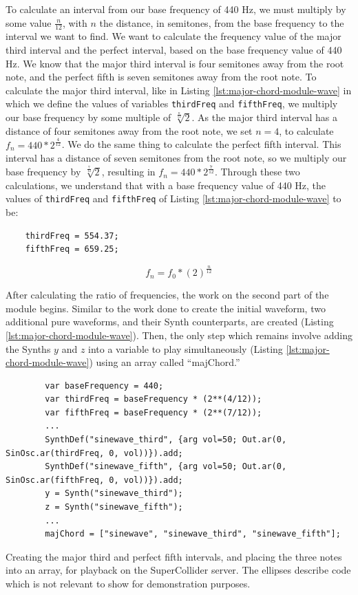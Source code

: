 To calculate an interval from our base frequency of 440 Hz, we must multiply by some value $\frac{n}{12}$, with $n$ the distance, in semitones, from the base frequency to the interval we want to find. We want to calculate the frequency value of the major third interval and the perfect interval, based on the base frequency value of 440 Hz. We know that the major third interval is four semitones away from the root note, and the perfect fifth is seven semitones away from the root note. To calculate the major third interval, like in Listing \ref{lst:major-chord-module-wave} in which we define the values of variables \texttt{thirdFreq} and \texttt{fifthFreq}, we multiply our base frequency by some multiple of $\sqrt[\frac{n}{12}]{2}$. As the major third interval has a distance of four semitones away from the root note, we set $n = 4$, to calculate $f_n = 440 * 2^{\frac{4}{12}}$. We do the same thing to calculate the perfect fifth interval. This interval has a distance of seven semitones from the root note, so we multiply our base frequency by $\sqrt[\frac{7}{12}]{2}$, resulting in $f_n = 440 * 2^{\frac{7}{12}}$. Through these two calculations, we understand that with a base frequency value of 440 Hz, the values of \texttt{thirdFreq} and \texttt{fifthFreq} of Listing \ref{lst:major-chord-module-wave} to be: 

\begin{verbatim}
    thirdFreq = 554.37;
    fifthFreq = 659.25;
\end{verbatim}

\begin{equation}
	f_n = f_0 * (2)^{\frac{n}{12}}
	\label{eq:equal-temperament-eq}
\end{equation}

After calculating the ratio of frequencies, the work on the second part of the module begins. Similar to the work done to create the initial waveform, two additional pure waveforms, and their Synth counterparts, are created (Listing \ref{lst:major-chord-module-wave}). Then, the only step which remains involve adding the Synths $y$ and $z$ into a variable to play simultaneously (Listing \ref{lst:major-chord-module-wave}) using an array called ``majChord.''

\begin{listing}
	\begin{lstlisting}
        var baseFrequency = 440;
		var thirdFreq = baseFrequency * (2**(4/12));
		var fifthFreq = baseFrequency * (2**(7/12));
		...
		SynthDef("sinewave_third", {arg vol=50; Out.ar(0, SinOsc.ar(thirdFreq, 0, vol))}).add;
		SynthDef("sinewave_fifth", {arg vol=50; Out.ar(0, SinOsc.ar(fifthFreq, 0, vol))}).add;
		y = Synth("sinewave_third");
		z = Synth("sinewave_fifth");
		...
		majChord = ["sinewave", "sinewave_third", "sinewave_fifth"];
	\end{lstlisting}
	\label{lst:major-chord-module-wave}
	\caption{Creating the major third and perfect fifth intervals, and placing the three notes into an array, for playback on the SuperCollider server. The ellipses describe code which is not relevant to show for demonstration purposes.}	
\end{listing}

